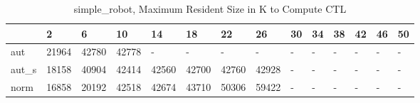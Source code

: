 \begin{table}
\caption{simple_robot, Maximum Resident Size in K to Compute CTL}
\label{simple_robot_CTL_size}
\begin{tabular}{llllllllllllll}
\toprule
 & 2 & 6 & 10 & 14 & 18 & 22 & 26 & 30 & 34 & 38 & 42 & 46 & 50 \\
\midrule
aut & 21964 & 42780 & 42778 & - & - & - & - & - & - & - & - & - & - \\
aut_s & 18158 & 40904 & 42414 & 42560 & 42700 & 42760 & 42928 & - & - & - & - & - & - \\
norm & 16858 & 20192 & 42518 & 42674 & 43710 & 50306 & 59422 & - & - & - & - & - & - \\
\bottomrule
\end{tabular}
\end{table}
